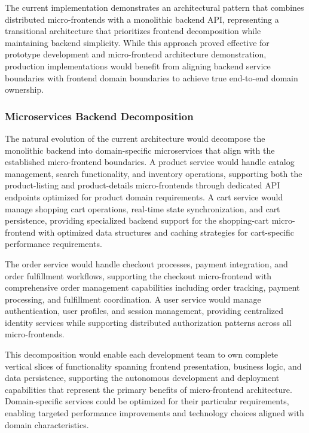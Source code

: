 \documentclass[12pt,a4paper]{report}
\begin{document}
The current implementation demonstrates an architectural pattern that combines distributed micro-frontends with a monolithic backend API, representing a transitional architecture that prioritizes frontend decomposition while maintaining backend simplicity. While this approach proved effective for prototype development and micro-frontend architecture demonstration, production implementations would benefit from aligning backend service boundaries with frontend domain boundaries to achieve true end-to-end domain ownership.

\subsubsection{Microservices Backend Decomposition}

The natural evolution of the current architecture would decompose the monolithic backend into domain-specific microservices that align with the established micro-frontend boundaries. A product service would handle catalog management, search functionality, and inventory operations, supporting both the product-listing and product-details micro-frontends through dedicated API endpoints optimized for product domain requirements. A cart service would manage shopping cart operations, real-time state synchronization, and cart persistence, providing specialized backend support for the shopping-cart micro-frontend with optimized data structures and caching strategies for cart-specific performance requirements.

The order service would handle checkout processes, payment integration, and order fulfillment workflows, supporting the checkout micro-frontend with comprehensive order management capabilities including order tracking, payment processing, and fulfillment coordination. A user service would manage authentication, user profiles, and session management, providing centralized identity services while supporting distributed authorization patterns across all micro-frontends.

This decomposition would enable each development team to own complete vertical slices of functionality spanning frontend presentation, business logic, and data persistence, supporting the autonomous development and deployment capabilities that represent the primary benefits of micro-frontend architecture. Domain-specific services could be optimized for their particular requirements, enabling targeted performance improvements and technology choices aligned with domain characteristics.
\end{document}
